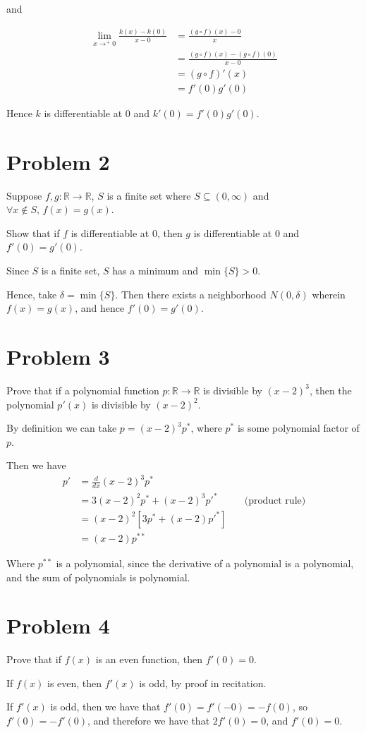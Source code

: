 \documentclass{article}
\begin{document}
and

\begin{align*}
        \lim_{x \rightarrow ^+0} \frac{k(x) - k(0)}{x - 0} &= \frac{(g \circ f)(x) - 0}{x} \\
                                                           &= \frac{(g \circ f)(x) - (g \circ f)(0)}{x - 0} \\
                                                           &= (g \circ f)'(x) \\
                                                           &= f'(0)g'(0)
\end{align*}

Hence $k$ is differentiable at 0 and $k'(0) = f'(0)g'(0)$. 

\section*{Problem 2}

Suppose $f, g: \mathbb{R}\rightarrow \mathbb{R}$, $S$ is a finite set where $S \subseteq (0, \infty)$ and $\forall x \notin S, \, f(x) = g(x)$. 

Show that if $f$ is differentiable at $0$, then $g$ is differentiable at 0 and $f'(0) = g'(0)$. 

Since $S$ is a finite set, $S$ has a minimum and $\min\{S\} > 0$. 

Hence, take $\delta = \min\{S\}$. Then there exists a neighborhood $N(0, \delta)$ wherein $f(x) = g(x)$, and hence $f'(0) = g'(0)$. 

\section*{Problem 3}

Prove that if a polynomial function $p: \mathbb{R} \rightarrow \mathbb{R}$ is divisible by $(x - 2)^3$, then the polynomial $p'(x)$ is divisible by $(x - 2)^2$. 

By definition we can take $p = (x - 2)^3p^*$, where $p^*$ is some polynomial factor of $p$. 

Then we have 
\begin{align*}
        p' &= \frac{d}{dx}(x - 2)^3 p^* \\
           &= 3(x-2)^2p^* + (x-2)^3p'^* & \quad \text{(product rule)}\\
           &= (x-2)^2\left[3p^* + (x-2)p'^* \right] \\
           &= (x-2)p^{**}
\end{align*}

Where $p^{**}$ is a polynomial, since the derivative of a polynomial is a polynomial, and the sum of polynomials is polynomial. 

\section*{Problem 4}

Prove that if $f(x)$ is an even function, then $f'(0) = 0$. 

If $f(x)$ is even, then $f'(x)$ is odd, by proof in recitation. 

If $f'(x)$ is odd, then we have that $f'(0) = f'(-0) = -f(0)$, so $f'(0) = -f'(0)$, and therefore we have that $2f'(0) = 0$, and $f'(0) = 0$. 
\end{document}
